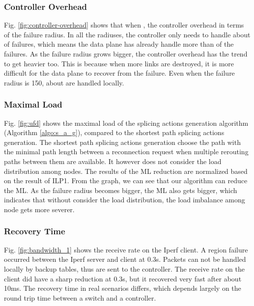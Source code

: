 \documentclass[10pt,journal]{IEEEtran}
\begin{document}
\subsubsection{Controller Overhead}
Fig. \ref{fig:controller-overhead} shows that when , the controller overhead in terms of the failure radius. In all the radiuses, the controller only needs to handle about  of failures, which means the data plane has already handle more than  of the failures. As the failure radius grows bigger, the controller overhead has the trend to get heavier too. This is because when more links are destroyed, it is more difficult for the data plane to recover from the failure. Even when the failure radius is 150, about  are handled locally.
\subsubsection{Maximal Load}
Fig. \ref{fig:ufd} shows the maximal load of the splicing actions generation algorithm (Algorithm \ref{algo:s_a_g}), compared to the shortest path splicing actions generation. The shortest path splicing actions generation choose the path with the minimal path length between a reconnection request  when multiple rerouting paths between them are available\cite{xie2014designing}. It however does not consider the load distribution among nodes. The results of the ML reduction are normalized based on the result of ILP1. From the graph, we can see that our algorithm can reduce the ML. As the failure radius becomes bigger, the ML also gets bigger, which indicates that without consider the load distribution, the load imbalance among node gets more severer.
\subsubsection{Recovery Time}
Fig. \ref{fig:bandwidth_1} shows the receive rate on the Iperf client. A region failure occurred between the Iperf server and client at 0.3s. Packets can not be handled locally by backup tables, thus are sent to the controller. The receive rate on the client did have a sharp reduction at 0.3s, but it recovered very fast after about 10ms. The recovery time in real scenarios differs, which depends largely on the round trip time between a switch and a controller.
\end{document}
